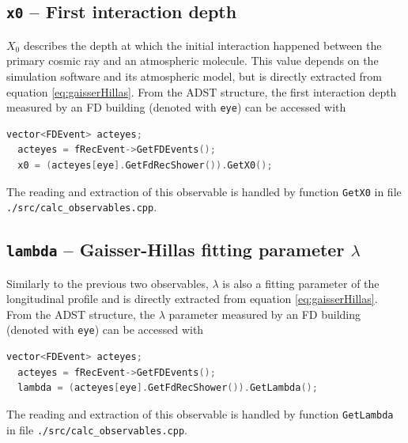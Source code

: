 \documentclass[12pt,a4paper]{report}
\begin{document}
\subsection{\texttt{x0} -- First interaction depth}
$X_0$ describes the depth at which the initial interaction happened between the primary cosmic ray and an atmospheric molecule. This value depends on the simulation software and its atmospheric model, but is directly extracted from equation \eqref{eq:gaisserHillas}. From the ADST structure, the first interaction depth measured by an FD building (denoted with \texttt{eye}) can be accessed with
\begin{lstlisting}[language=C++]
  vector<FDEvent> acteyes;
  acteyes = fRecEvent->GetFDEvents();
  x0 = (acteyes[eye].GetFdRecShower()).GetX0();
\end{lstlisting}
The reading and extraction of this observable is handled by function \texttt{GetX0} in file \texttt{./src/calc\_observables.cpp}.

\subsection{\texttt{lambda} -- Gaisser-Hillas fitting parameter $\lambda$}
Similarly to the previous two observables, $\lambda$ is also a fitting parameter of the longitudinal profile and is directly extracted from equation \eqref{eq:gaisserHillas}. From the ADST structure, the $\lambda$ parameter measured by an FD building (denoted with \texttt{eye}) can be accessed with
\begin{lstlisting}[language=C++]
  vector<FDEvent> acteyes;
  acteyes = fRecEvent->GetFDEvents();
  lambda = (acteyes[eye].GetFdRecShower()).GetLambda();
\end{lstlisting}
The reading and extraction of this observable is handled by function \texttt{GetLambda} in file \texttt{./src/calc\_observables.cpp}.
\end{document}
